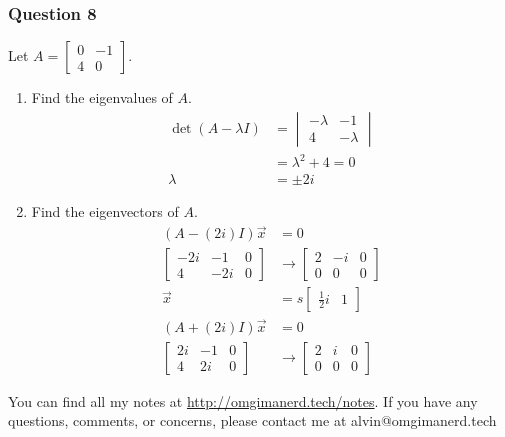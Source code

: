 \documentclass{math}
\begin{document}
\subsubsection*{Question 8}
Let \( A = \begin{bmatrix}0 & -1 \\ 4 & 0\end{bmatrix} \).
\begin{enumerate}
  \item Find the eigenvalues of \( A \).
  \begin{align*}
    \det(A-\lambda I) &= \begin{vmatrix}
      -\lambda & -1 \\
      4 & -\lambda
    \end{vmatrix} \\
    &= \lambda^2+4 = 0 \\
    \lambda &= \pm2i
  \end{align*}
  \item Find the eigenvectors of \( A \).
  \begin{align*}
    (A-(2i)I)\vec{x} &= 0 \\
    \left[\begin{array}{cc|c}
      -2i & -1 & 0 \\
      4 & -2i & 0
    \end{array}\right] &\to \left[\begin{array}{cc|c}
      2 & -i & 0 \\
      0 & 0 & 0
    \end{array}\right] \\
    \vec{x} &= s\begin{bmatrix}\frac{1}{2}i & 1\end{bmatrix} \\
    (A+(2i)I)\vec{x} &= 0 \\
    \left[\begin{array}{cc|c}
      2i & -1 & 0 \\
      4 & 2i & 0
    \end{array}\right] &\to \left[\begin{array}{cc|c}
      2 & i & 0 \\
      0 & 0 & 0
    \end{array}\right]
  \end{align*}
\end{enumerate}

\begin{center}
  You can find all my notes at \url{http://omgimanerd.tech/notes}. If you have
  any questions, comments, or concerns, please contact me at
  alvin@omgimanerd.tech
\end{center}
\end{document}
